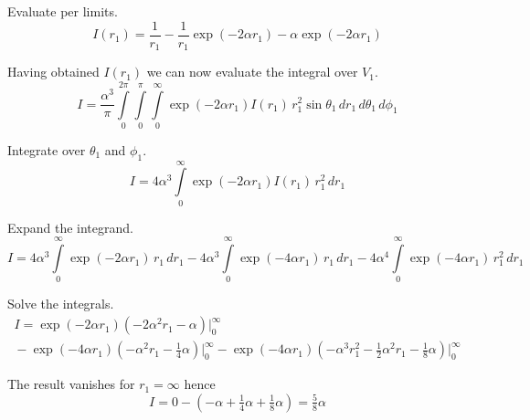 \documentclass[12pt]{article}
\begin{document}
\noindent
Evaluate per limits.
\begin{equation*}
I(r_1)=\frac{1}{r_1}-\frac{1}{r_1}\exp(-2\alpha r_1)-\alpha\exp(-2\alpha r_1)
\tag{6}
\end{equation*}

\noindent
Having obtained $I(r_1)$ we can now evaluate the integral over $V_1$.
\begin{equation*}
I=\frac{\alpha^3}{\pi}\int\limits_0^{2\pi}\int\limits_0^\pi\int\limits_0^\infty
\exp(-2\alpha r_1)I(r_1)\,r_1^2\sin\theta_1\,dr_1\,d\theta_1\,d\phi_1
\end{equation*}

\noindent
Integrate over $\theta_1$ and $\phi_1$.
\begin{equation*}
I=4\alpha^3\int\limits_0^\infty
\exp(-2\alpha r_1)I(r_1)\,r_1^2\,dr_1
\end{equation*}

\noindent
Expand the integrand.
\begin{equation*}
I=4\alpha^3\int\limits_0^\infty\exp(-2\alpha r_1)\,r_1\,dr_1
-4\alpha^3\int\limits_0^\infty\exp(-4\alpha r_1)\,r_1\,dr_1
-4\alpha^4\int\limits_0^\infty\exp(-4\alpha r_1)\,r_1^2\,dr_1
\end{equation*}

\noindent
Solve the integrals.
\begin{multline*}
I=\exp(-2\alpha r_1)\left(-2\alpha^2r_1-\alpha\right)\bigg|_0^\infty
\\
{}-\exp(-4\alpha r_1)\left(-\alpha^2r_1-\tfrac{1}{4}\alpha\right)\bigg|_0^\infty
{}-\exp(-4\alpha r_1)\left(-\alpha^3r_1^2-\tfrac{1}{2}\alpha^2r_1-\tfrac{1}{8}\alpha\right)\bigg|_0^\infty
\end{multline*}

\noindent
The result vanishes for $r_1=\infty$ hence
\begin{equation*}
I=0-\left(-\alpha+\tfrac{1}{4}\alpha+\tfrac{1}{8}\alpha\right)=\tfrac{5}{8}\alpha
\tag{7}
\end{equation*}
\end{document}
